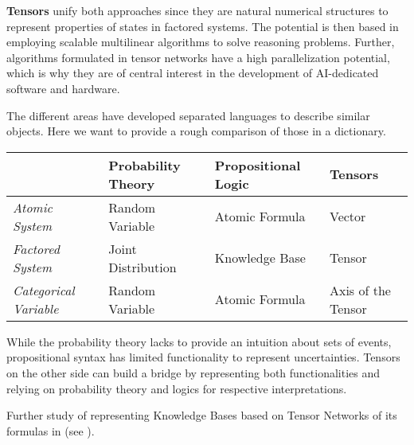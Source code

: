 \textbf{Tensors} unify both approaches since they are natural numerical structures to represent properties of states in factored systems.
The potential is then based in employing scalable multilinear algorithms to solve reasoning problems.
Further, algorithms formulated in tensor networks have a high parallelization potential, which is why they are of central interest in the development of AI-dedicated software and hardware.

The different areas have developed separated languages to describe similar objects.
Here we want to provide a rough comparison of those in a dictionary.

\begin{tabular}{l|l|l|l}
    & \textbf{Probability Theory} & \textbf{Propositional Logic} & \textbf{Tensors}   \\
    \hline
    \textit{Atomic System}        & Random Variable             & Atomic Formula               & Vector             \\
    \textit{Factored System}      & Joint Distribution          & Knowledge Base               & Tensor             \\
    \textit{Categorical Variable} & Random Variable             & Atomic Formula               & Axis of the Tensor
\end{tabular}

While the probability theory lacks to provide an intuition about sets of events, propositional syntax has limited functionality to represent uncertainties.
Tensors on the other side can build a bridge by representing both functionalities and relying on probability theory and logics for respective interpretations.



Further study of representing Knowledge Bases based on Tensor Networks of its formulas in  (see ).




